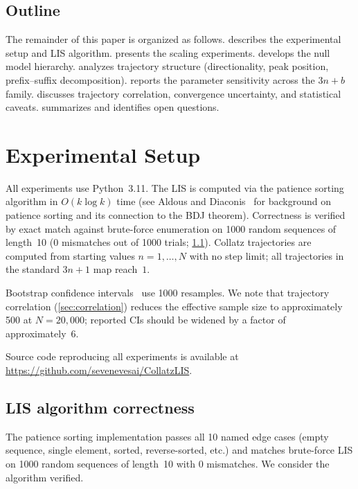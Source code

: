 \documentclass[11pt]{article}
\theoremstyle{definition}
\theoremstyle{remark}
\begin{document}
\subsection{Outline}

The remainder of this paper is organized as follows.
 describes the experimental setup and LIS algorithm.
 presents the scaling experiments.
 develops the null model hierarchy.
 analyzes trajectory structure (directionality, peak
position, prefix--suffix decomposition).
 reports the parameter sensitivity across the $3n+b$
family.
 discusses trajectory correlation, convergence
uncertainty, and statistical caveats.
 summarizes and identifies open questions.

\section{Experimental Setup}\label{sec:setup}

All experiments use Python~3.11. The LIS is computed via the patience
sorting algorithm in $O(k \log k)$ time (see Aldous and
Diaconis~\cite{AldousDiaconis1999} for background on patience sorting and
its connection to the BDJ theorem). Correctness is verified by
exact match against brute-force enumeration on 1000 random sequences of
length~10 (0 mismatches out of 1000 trials; \cref{sec:correctness}).
Collatz trajectories are computed from starting values $n = 1, \ldots, N$
with no step limit; all trajectories in the standard $3n+1$ map reach~$1$.

Bootstrap confidence intervals~\cite{Efron1979} use 1000 resamples. We note
that trajectory
correlation (\cref{sec:correlation}) reduces the effective sample size to
approximately 500 at $N = 20{,}000$; reported CIs should be widened by a
factor of approximately~6.

Source code reproducing all experiments is available at
\url{https://github.com/sevenevesai/CollatzLIS}.

\subsection{LIS algorithm correctness}\label{sec:correctness}

The patience sorting implementation passes all 10 named edge cases
(empty sequence, single element, sorted, reverse-sorted, etc.) and
matches brute-force LIS on 1000 random sequences of length~10 with 0
mismatches. We consider the algorithm verified.
\end{document}
